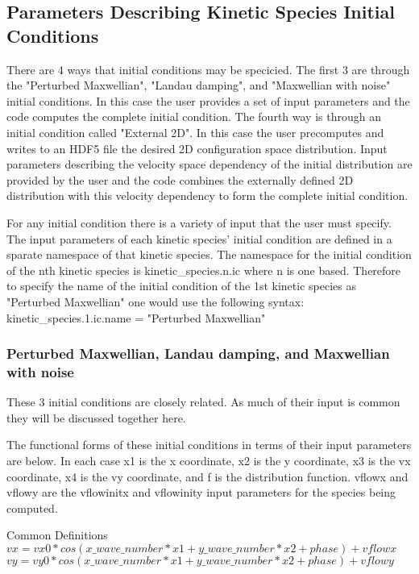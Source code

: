 \documentclass[11pt]{amsart}
\begin{document}
\subsection*{Parameters Describing Kinetic Species Initial Conditions}
There are 4 ways that initial conditions may be specicied.  The first 3 are
through the "Perturbed Maxwellian", "Landau damping", and
"Maxwellian with noise" initial conditions.  In this case the user
provides a set of input parameters and the code computes the complete initial
condition.  The fourth way is through an initial condition called 
"External 2D".  In this case the user precomputes and writes to an HDF5 file
the desired 2D configuration space distribution.  Input parameters describing
the velocity space dependency of the initial distribution are provided by the
user and the code combines the externally defined 2D distribution with this
velocity dependency to form the complete initial condition.

For any initial condition there is a variety of input that the user must
specify.  The input parameters of each kinetic species' initial condition are
defined in a sparate namespace of that kinetic species.  The namespace for the
initial condition of the nth kinetic species is kinetic\_species.n.ic where n
is one based.  Therefore to specify the name of the initial condition of the
1st kinetic species as "Perturbed Maxwellian" one would use the following
syntax: \\
kinetic\_species.1.ic.name = "Perturbed Maxwellian"

\subsubsection*{Perturbed Maxwellian, Landau damping, and Maxwellian with noise}
These 3 initial conditions are closely related.  As much of their input is
common they will be discussed together here.

The functional forms of these initial conditions in terms of their input
parameters are below.  In each case x1 is the x coordinate, x2 is the y
coordinate, x3 is the vx coordinate, x4 is the vy coordinate, and f is the
distribution function.  vflowx and vflowy are the vflowinitx and vflowinity
input parameters for the species being computed.

Common Definitions \\
\begin{math}vx = vx0*cos(x\_wave\_number*x1+y\_wave\_number*x2+phase)+vflowx\end{math} \\
\begin{math}vy = vy0*cos(x\_wave\_number*x1+y\_wave\_number*x2+phase)+vflowy\end{math}
\end{document}
